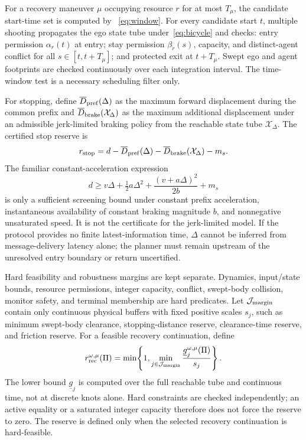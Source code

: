\documentclass[letterpaper]{article} %
\begin{document}
For a recovery maneuver $\mu$ occupying resource $r$ for at most
$T_\mu$, the candidate start-time set is computed by
~\eqref{eq:window}. For every candidate start $t$, multiple shooting
propagates the ego state tube under~\eqref{eq:bicycle} and checks: entry
permission $\alpha_r(t)$ at entry; stay permission $\beta_r(s)$,
capacity, and distinct-agent conflict for all $s\in[t,t+T_\mu]$; and
protected exit at $t+T_\mu$. Swept ego and agent footprints are checked
continuously over each integration interval. The time-window test is a
necessary scheduling filter only.

For stopping, define $\overline D_{\rm pref}(\Delta)$ as the maximum
forward displacement during the common prefix and
$\overline D_{\rm brake}(\mathcal X_\Delta)$ as the maximum
additional displacement under an admissible jerk-limited braking policy
from the reachable state tube $\mathcal X_\Delta$. The certified stop
reserve is
\begin{equation}
r_{\rm stop}=d-\overline D_{\rm pref}(\Delta)
-\overline D_{\rm brake}(\mathcal X_\Delta)-m_s.
\label{eq:stop}
\end{equation}
The familiar constant-acceleration expression
\begin{equation}
d\geq v\Delta+\tfrac12a\Delta^2+
\frac{(v+a\Delta)^2}{2b}+m_s
\label{eq:stop-special}
\end{equation}
is only a sufficient screening bound under constant prefix acceleration,
instantaneous availability of constant braking magnitude $b$, and
nonnegative unsaturated speed. It is not the certificate for the jerk-limited
model. If the protocol provides no finite latest-information time, $\Delta$
cannot be inferred from message-delivery latency alone; the planner must
remain upstream of the unresolved entry boundary or return uncertified.

Hard feasibility and robustness margins are kept separate. Dynamics,
input/state bounds, resource permissions, integer capacity, conflict,
swept-body collision, monitor safety, and terminal membership are hard
predicates. Let $\mathcal J_{\rm margin}$ contain only continuous physical
buffers with fixed positive scales $s_j$, such as minimum swept-body
clearance, stopping-distance reserve, clearance-time reserve, and friction
reserve. For a feasible recovery continuation, define
\begin{equation}
r_{\rm rec}^{\omega,\mu}(\Pi)=
\min\!\left\{1,\min_{j\in\mathcal J_{\rm margin}}
\frac{\underline g_j^{\omega,\mu}(\Pi)}{s_j}\right\}.
\label{eq:margin}
\end{equation}
The lower bound $\underline g_j$ is computed over the full reachable tube
and continuous time, not at discrete knots alone. Hard constraints are
checked independently; an active equality or a saturated integer capacity
therefore does not force the reserve to zero. The reserve is defined only
when the selected recovery continuation is hard-feasible.
\end{document}
